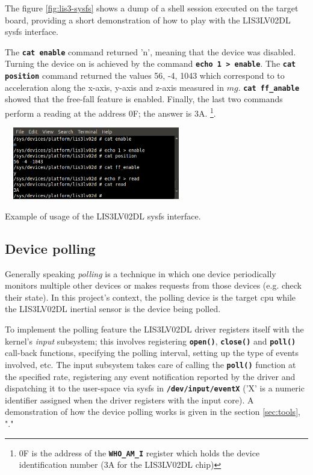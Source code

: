 \documentclass[a4paper,10pt]{article}
\makeatletter
\newenvironment{figurehere}{\def\@captype{figure}\vspace{2ex}}{\vspace{2ex}}
\newcommand{\keyword}[1]{\texttt{\textbf{#1}}}
\makeatother
\begin{document}
\begin{multicols}{2}
The figure \ref{fig:lis3-sysfs} shows a
dump of a shell session executed on the target board, providing a short
demonstration of how to play with the LIS3LV02DL sysfs interface.

The \keyword{cat enable} command returned 'n', meaning that the device was
disabled.
Turning the device on is achieved by the command \keyword{echo 1 > enable}.
The \keyword{cat position} command returned the values 56, -4, 1043 which
correspond to to acceleration along the x-axis, y-axis and z-axis measured
in $mg$. \keyword{cat ff\_anable} showed that the free-fall feature is enabled.
Finally, the last two commands perform a reading at the address 0F; the answer
is 3A.
\footnote{0F is the address of the \keyword{WHO\_AM\_I} register which holds
the device identification number (3A for the LIS3LV02DL chip)}.

\begin{figurehere}
 \centering
 \includegraphics[width=8cm, height=3.15cm]{./figures/lis3lv02d-sysfs.png}
 \caption{Example of usage of the LIS3LV02DL sysfs interface.}
 \label{fig:lis3-sysfs}
\end{figurehere}


\subsection{Device polling}
\label{sec:lis3_poll}

Generally speaking \emph{polling} is a technique in which one device periodically
monitors multiple other devices or makes requests from those devices (e.g. check
their state). In this project's context, the polling device is the target
cpu while the LIS3LV02DL inertial sensor is the device being polled.

To implement the polling feature the LIS3LV02DL driver registers itself with the
kernel's \emph{input} subsystem; this involves registering \keyword{open()},
\keyword{close()} and \keyword{poll()} call-back functions, specifying
the polling interval, setting up the type of events involved, etc.
The input subsystem takes care of calling the \keyword{poll()} function at the
specified rate, registering any event notification reported by the driver and
dispatching it to the user-space via sysfs in
\keyword{/dev/input/eventX} ('X' is a numeric identifier assigned when the
driver registers with the input core).
A demonstration of how the device polling works is given in the section
\ref{sec:tools}, "."


\end{multicols}
\end{document}
